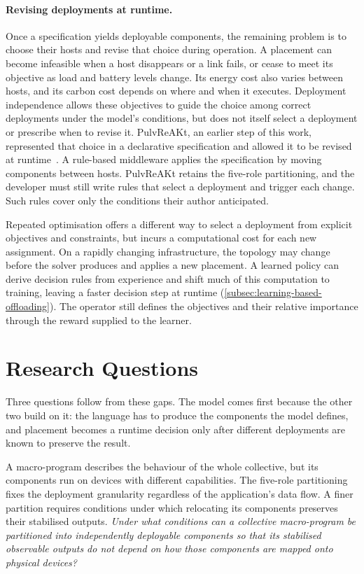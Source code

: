 \paragraph{Revising deployments at runtime.}
Once a specification yields deployable components, the remaining problem is to choose their hosts and revise that choice during operation.
A placement can become infeasible when a host disappears or a link fails,
or cease to meet its objective as load and battery levels change.
Its energy cost also varies between hosts, and its carbon cost depends on where and when it executes.
%
Deployment independence allows these objectives to guide the choice among correct deployments under the model's conditions,
but does not itself select a deployment or prescribe when to revise it.
%
PulvReAKt, an earlier step of this work,
represented that choice in a declarative specification and allowed it to be revised at runtime~\cite{DBLP:journals/fgcs/FarabegoliPCV24}.
%
A rule-based middleware applies the specification by moving components between hosts.
%
PulvReAKt retains the five-role partitioning,
and the developer must still write rules that select a deployment and trigger each change.
%
Such rules cover only the conditions their author anticipated.

Repeated optimisation offers a different way to select a deployment from explicit objectives and constraints,
but incurs a computational cost for each new assignment.
On a rapidly changing infrastructure, the topology may change before the solver produces and applies a new placement.
%
A learned policy can derive decision rules from experience and shift much of this computation to training,
leaving a faster decision step at runtime (\cref{subsec:learning-based-offloading}).
The operator still defines the objectives and their relative importance through the reward supplied to the learner.

\section{Research Questions}
\label{sec:research-questions}

Three questions follow from these gaps.
%
The model comes first because the other two build on it:
the language has to produce the components the model defines,
and placement becomes a runtime decision only after different deployments are known to preserve the result.

A macro-program describes the behaviour of the whole collective,
but its components run on devices with different capabilities.
%
The five-role partitioning fixes the deployment granularity regardless of the application's data flow.
A finer partition requires conditions under which relocating its components preserves their stabilised outputs.
%
\emph{Under what conditions can a collective macro-program be partitioned into independently deployable components so that its stabilised observable outputs do not depend on how those components are mapped onto physical devices?}


